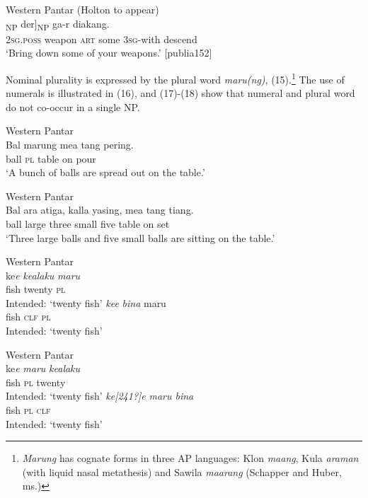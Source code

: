 \ea%
\label{ex:14}
Western Pantar (Holton to appear)\\
\gll [[{Hai} bloppa sing]\textsubscript{NP} {der}]\textsubscript{NP} ga-r diakang.  \\
  \textsc{2sg.poss} weapon \textsc{art} some 3\textsc{sg-}with descend  \\
\glt `Bring down some of your weapons.' [publia152]
\z






Nominal plurality is expressed by the plural word \textit{maru(ng)}, (15).\footnote{  \textit{Marung} has cognate forms in three AP languages: Klon \textit{maang}, Kula \textit{araman} (with liquid nasal metathesis) and Sawila \textit{maarang} (Schapper and Huber, ms.)} The use of numerals is illustrated in (16), and (17)-(18) show that numeral and plural word do not co-occur in a single NP.


\ea%
\label{ex:15}
Western Pantar \citep{Holton2012}\\
\gll  Bal  marung mea tang pering. \\
 ball \textsc{pl} table on pour   \\
\glt `A bunch of balls are spread out on the table.'
\z







\ea %
\label{bkm:Ref334530759}
Western Pantar \citep{Holton2012}\\
\gll Bal ara atiga, kalla yasing, mea tang {ti}{{\textglotstop}}{ang.} \\
 ball large three small five table on  set \\
\glt `Three large balls and five small balls are sitting on the table.'
\z



\ea%
\label{ex:17}
Western Pantar \citep{Holton2012}\\
\ea
\gll *ke\textit{{\textglotstop}}\textit{e} \textit{kealaku} \textit{maru} \\
   fish  twenty \textsc{pl} \\
\glt Intended: \textsc{`}twenty fish'
\ex
\gll *\textit{ke}\textit{{\textglotstop}}\textit{e} \textit{bina} maru \\
 fish \textsc{clf} \textsc{pl} \\
\glt Intended: `twenty fish'
\z
\z


\ea%
\label{ex:18}
Western Pantar \citep{Holton2012}\\
\ea
\gll *ke\textit{{\textglotstop}}\textit{e } \textit{maru} \textit{kealaku} \\
   fish  \textsc{pl} twenty \\
\glt Intended: `twenty fish'
\ex *\textit{ke}\textit{[241?]}\textit{e} \textit{maru  bina} \\
 fish \textsc{pl} \textsc{clf} \\
 \glt Intended: `twenty fish'
\z
\z

